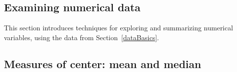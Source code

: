 \begin{doublespace}

\section[Examining numerical data]{Examining numerical data}
\label{numericalData}


This section introduces techniques for exploring and summarizing numerical variables, using the  data from Section~\ref{dataBasics}.

\subsection{Measures of center: mean and median}
\label{measuresOfCenter}


\end{doublespace}
